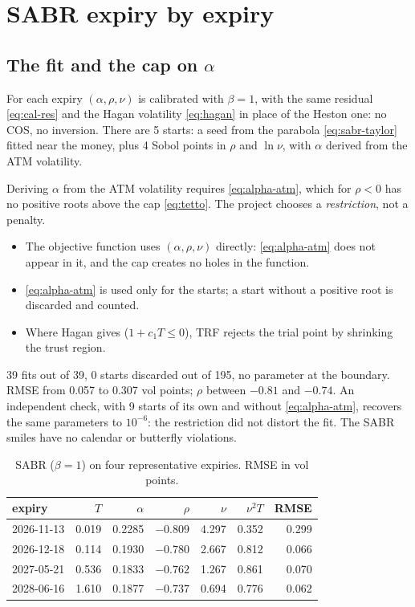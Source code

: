 \section{SABR expiry by expiry}
\subsection{\texorpdfstring{The fit and the cap on $\alpha$}{The fit and the cap on alpha}}
For each expiry $(\alpha,\rho,\nu)$ is calibrated with $\beta=1$, with the same residual \eqref{eq:cal-res} and the
Hagan volatility \eqref{eq:hagan} in place of the Heston one: no COS, no inversion. There are 5 starts: a seed from
the parabola \eqref{eq:sabr-taylor} fitted near the money, plus 4 Sobol points in $\rho$ and $\ln\nu$, with $\alpha$
derived from the ATM volatility.

Deriving $\alpha$ from the ATM volatility requires \eqref{eq:alpha-atm}, which for $\rho<0$ has no positive roots above
the cap \eqref{eq:tetto}. The project chooses a \emph{restriction}, not a penalty.
\begin{itemize}
\item The objective function uses $(\alpha,\rho,\nu)$ directly: \eqref{eq:alpha-atm} does not appear in it, and the cap
creates no holes in the function.
\item \eqref{eq:alpha-atm} is used only for the starts; a start without a positive root is discarded and counted.
\item Where Hagan gives  ($1+c_1T\le0$), TRF rejects the trial point by shrinking the trust region.
\end{itemize}

\begin{progetto}[title={In the qpricer project: SABR on the 39 expiries}]
39 fits out of 39, 0 starts discarded out of 195, no parameter at the boundary. RMSE from 0.057 to 0.307 vol points;
$\rho$ between $-0.81$ and $-0.74$. An independent check, with 9 starts of its own and without \eqref{eq:alpha-atm},
recovers the same parameters to $10^{-6}$: the restriction did not distort the fit. The SABR smiles have no calendar
or butterfly violations.
\end{progetto}

\begin{table}[htbp]
\centering
\small
\caption{SABR ($\beta=1$) on four representative expiries. RMSE in vol points.}
\label{tab:cal-sabr}
\begin{tabularx}{\textwidth}{X r r r r r r}
\toprule
expiry & $T$ & $\alpha$ & $\rho$ & $\nu$ & $\nu^2T$ & RMSE\\
\midrule
2026-11-13 & 0.019 & 0.2285 & $-0.809$ & 4.297 & 0.352 & 0.299\\
2026-12-18 & 0.114 & 0.1930 & $-0.780$ & 2.667 & 0.812 & 0.066\\
2027-05-21 & 0.536 & 0.1833 & $-0.762$ & 1.267 & 0.861 & 0.070\\
2028-06-16 & 1.610 & 0.1877 & $-0.737$ & 0.694 & 0.776 & 0.062\\
\bottomrule
\end{tabularx}
\end{table}

